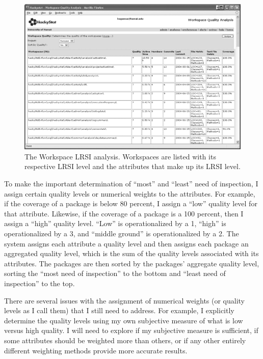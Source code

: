 \begin{figure}[ht]
  \centering
  \includegraphics[width=1.00\textwidth]{WorkspaceQuality.eps}
  \caption{The Workspace LRSI analysis. Workspaces are listed with its
  respective LRSI level and the attributes that make up its LRSI
  level.
}
  \label{fig:WorkspaceQualityAnalysis}
\end{figure}

To make the important determination of ``most'' and ``least'' need of
inspection, I assign certain quality levels or numerical weights to the
attributes. For example, if the coverage of a package is below 80 percent,
I assign a ``low'' quality level for that attribute. Likewise, if the
coverage of a package is a 100 percent, then I assign a ``high'' quality
level. ``Low'' is operationalized by a 1, ``high'' is operationalized by a
3, and ``middle ground'' is operationalized by a 2. The system assigns each
attribute a quality level and then assigns each package an aggregated
quality level, which is the sum of the quality levels associated with its
attributes. The packages are then sorted by the packages' aggregate quality
level, sorting the ``most need of inspection'' to the bottom and ``least need
of inspection'' to the top.

There are several issues with the assignment of numerical weights (or
quality levels as I call them) that I still need to address. For example, I
explicitly determine the quality levels using my own subjective measure of
what is low versus high quality. I will need to explore if my subjective
measure is sufficient, if some attributes should be weighted more than
others, or if any other entirely different weighting methods provide more
accurate results.


